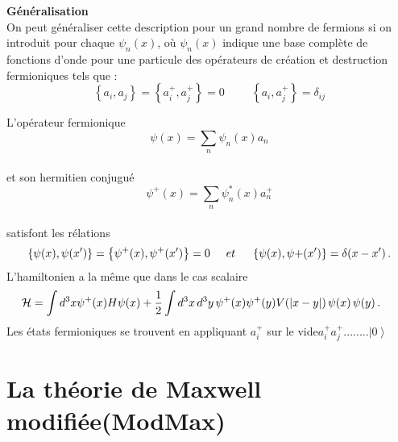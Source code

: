 \documentclass[12pt,a4paper, openany]{article}
\begin{document}
 \textbf{Généralisation}\\
 
 \hspace{0.5cm}On peut généraliser cette description pour un grand nombre de fermions si on introduit pour chaque $\psi_n(x)$, où  $\psi_n(x)$ indique une base complète de fonctions d’onde pour une particule des opérateurs de création et destruction fermioniques tels que :
 \begin{equation}
 	\left\{a_i,a_j\right\}=\left\{a_i^{+},a_j^{+}\right\}=0 \hspace{1cm} \left\{a_i,a_j^{+}\right\}=\delta_{ij}
 \end{equation}
 
 \hspace{0.5cm}L'opérateur fermionique\\ 
 $$\psi(x)=\sum_{n}{\psi}_n(x)a_n $$ \\
 et son hermitien conjugué 
 $$\psi^{+}(x)=\sum_{n}{\psi}^{*}_n(x)a^{+}_n $$ \\
 satisfont les rélations \\
 \begin{equation}
 	\left\{\psi(x),\psi(x')\right\}=\left\{\psi^{+}(x),
 	\psi^{+}(x')\right\}=0 \hspace{0.5cm} et \hspace{0.5cm} \left\{\psi(x),
 	\psi{+}(x')\right\}=\delta(x-x')\,.
 \end{equation}
 L'hamiltonien a la m\^{e}me que dans le cas scalaire 
 \begin{equation}
\hspace{-0.5cm} \mathcal{H}=\int d^{3}x\psi^{+}(x)H\psi(x)+\frac{1}{2}\int d^{3}x\,d^{3}y\,\psi^{+}(x)\psi^{+}(y)V(\left|x-y\right|)\,\psi(x)\,\psi(y)\,.
 \end{equation}
 Les états fermioniques se trouvent en appliquant $a^{+}_i$ sur le vide\hspace{0.1cm}$a^{+}_ia^{+}_j........\left|0\right\rangle$

 





 









 
\newpage
\section{La théorie de Maxwell modifiée(ModMax)}
\end{document}
